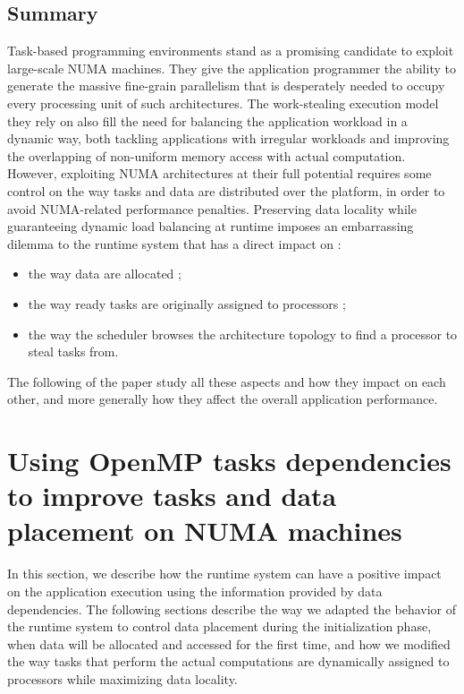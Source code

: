 \documentclass{Styles/llncs}
\begin{document}
\subsection{Summary}
Task-based programming environments stand as a promising candidate to exploit large-scale NUMA machines.
They give the application programmer the ability to generate the massive fine-grain parallelism that is desperately needed to occupy every processing unit of such architectures.
The work-stealing execution model they rely on also fill the need for balancing the application workload in a dynamic way, both tackling applications with irregular workloads and improving the overlapping of non-uniform memory access with actual computation.
However, exploiting NUMA architectures at their full potential requires some control on the way tasks and data are distributed over the platform, in order to avoid NUMA-related performance penalties. 
Preserving data locality while guaranteeing dynamic load balancing at runtime imposes an embarrassing dilemma to the runtime system that has a direct impact on :
\begin{itemize}   
\item the way data are allocated ;
\item the way ready tasks are originally assigned to processors ;
\item the way the scheduler browses the architecture topology to find a processor to steal tasks from.
\end{itemize}

The following of the paper study all these aspects and how they impact on each other, and more generally how they affect the overall application performance.

\section{Using OpenMP tasks dependencies to improve tasks and data
  placement on NUMA machines}
\label{sec:contributions}

In this section, we describe how the runtime system can have a positive impact on the application execution using the information provided by data dependencies.
The following sections describe the way we adapted the behavior of the runtime system to control data placement during the initialization phase, when data will be allocated and accessed for the first time, and how we modified the way tasks that perform the actual computations are dynamically assigned to processors while maximizing data locality.
\end{document}
